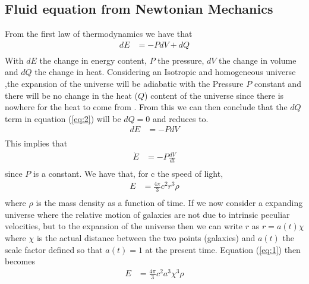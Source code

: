 \documentclass[a4paper, 11pt]{FSKH_623_Report}
\numberwithin{equation}{section}
\newcommand{\driv}[2]{\frac{d #1}{d #2}}
\begin{document}
\subsection{Fluid equation from Newtonian Mechanics}

From the first law of thermodynamics we have that  
\begin{equation}\label{eq:2}
\begin{split}
dE &= -PdV + dQ\\
\end{split}
\end{equation}
With $dE$ the change in energy content, $P$ the pressure, $dV$ the change in volume and $dQ$ the change in heat.
Considering an Isotropic and homogeneous universe \citep{notes4},the expansion of the universe will be adiabatic with the Pressure $P$ constant and there will be no change in the heat ($Q$) content of the universe since there is nowhere for the heat to come from \citep{notes4}. From this we can then conclude that the $dQ$ term in equation (\ref{eq:2}) will be $dQ=0$ and reduces to.
\begin{equation}
\begin{split}
dE &= -PdV \\
\end{split}
\end{equation}
This implies that
\begin{equation}\label{eq:3}
\begin{split}
\dot{E} &= -P\driv{V}{t}             \\
\end{split}
\end{equation}
since $P$ is a constant.
We have that, for c the speed of light, 
\begin{equation}\label{eq:1}
\begin{split}
E &=\frac{4\pi}{3}c^{2}r^{3}\rho\\
\end{split}
\end{equation}
where $\rho$ is the mass density as a function of time.
If we now consider a expanding universe where the relative motion of galaxies are not due to intrinsic peculiar velocities, but to the expansion of the universe then we can write $r$ as $r=a(t)\chi$ where $\chi$ is the actual distance between the two points (galaxies) and $a(t)$ the scale factor defined so that $a(t)=1$ at the present time. Equation (\ref{eq:1}) then becomes
\begin{equation}
\begin{split}
E &=\frac{4\pi}{3}c^{2}a^{3}\chi^{3}\rho\\
\end{split}
\end{equation}
\end{document}
